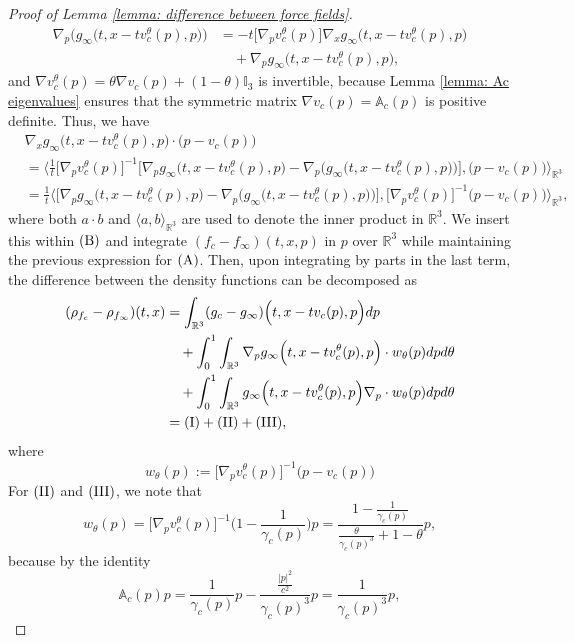 \documentclass[reqno, 11pt, letterpaper]{amsart}
\theoremstyle{remark}
\numberwithin{equation}{section}
\numberwithin{theorem}{section}
\numberwithin{table}{section}
\numberwithin{figure}{section}
\begin{document}
\begin{proof}[Proof of Lemma \ref{lemma: difference between force fields}]
$$\begin{aligned}
\nabla_p\Big(g_\infty\Big(t,x-tv_c^\theta(p),p\Big)\Big)&=-t\Big[\nabla_p v_c^\theta(p)\Big]\nabla_xg_\infty\Big(t,x-tv_c^\theta(p),p\Big)\\
&\quad+\nabla_pg_\infty\Big(t,x-tv_c^\theta(p),p\Big),
\end{aligned}$$
and $\nabla v_c^\theta(p)=\theta \nabla v_c(p)+(1-\theta)\mathbb{I}_3$ is invertible, because Lemma \ref{lemma: Ac eigenvalues} ensures that the symmetric matrix $\nabla v_c(p)=\mathbb{A}_c(p)$ is positive definite. Thus, we have
$$\begin{aligned}
&\nabla_xg_\infty\Big(t,x-tv_c^\theta(p),p\Big)\cdot\big(p-v_c(p)\big)\\
&=\bigg\langle\frac{1}{t}\Big[\nabla_p v_c^\theta(p)\Big]^{-1}\bigg[\nabla_p g_\infty\Big(t,x-tv_c^\theta(p),p\Big)-\nabla_p\Big(g_\infty\Big(t,x-tv_c^\theta(p),p\Big)\Big)\bigg],\big(p-v_c(p)\big)\bigg\rangle_{\mathbb{R}^3}\\
&=\frac{1}{t}\bigg\langle\bigg[\nabla_pg_\infty\Big(t,x-tv_c^\theta(p),p\Big)-\nabla_p\Big(g_\infty\Big(t,x-tv_c^\theta(p),p\Big)\Big)\bigg],\Big[\nabla_p v_c^\theta(p)\Big]^{-1}\big(p-v_c(p)\big)\bigg\rangle_{\mathbb{R}^3},
\end{aligned}$$
where both $a\cdot b$ and $\langle a, b\rangle_{\mathbb{R}^3}$ are used to denote the inner product in $\mathbb{R}^3$. We insert this within $\textup{(B)}$ and integrate $(f_c-f_\infty)(t,x,p)$ in $p$ over $\mathbb{R}^3$ while maintaining the previous expression for $(\textup{A})$. Then, upon integrating by parts in the last term, the difference between the density functions can be decomposed as 
$$\begin{aligned}
(\rho_{f_c}-\rho_{f_\infty})(t,x)&=\int_{\mathbb{R}^3}(g_c-g_\infty)\Big(t,x-tv_c(p),p\Big)dp\\
&\quad+\int_0^1\int_{\mathbb{R}^3}\nabla_pg_\infty\Big(t,x-tv_c^\theta(p),p\Big)\cdot w_\theta(p)dpd\theta\\
&\quad+\int_0^1\int_{\mathbb{R}^3}g_\infty\Big(t,x-tv_c^\theta(p),p\Big)\nabla_p\cdot w_\theta(p)dpd\theta\\
&=\textup{(I)}+\textup{(II)}+\textup{(III)},
\end{aligned}$$
where 
$$w_\theta(p):=\Big[\nabla_p v_c^\theta(p)\Big]^{-1}\big(p-v_c(p)\big)$$
For $\textup{(II)}$ and $\textup{(III)}$, we note that  
$$w_\theta(p)=\Big[\nabla_p v_c^\theta(p)\Big]^{-1}\bigg(1-\frac{1}{\gamma_c(p)}\bigg)p=\frac{1-\frac{1}{\gamma_c(p)}}{\frac{\theta}{\gamma_c(p)^3}+1-\theta}p,$$
because by the identity 
$$\mathbb{A}_c(p)p=\frac{1}{\gamma_c(p)}p-\frac{\frac{|p|^2}{c^2}}{\gamma_c(p)^3}p=\frac{1}{\gamma_c(p)^3}p,$$

\end{proof}
\end{document}
